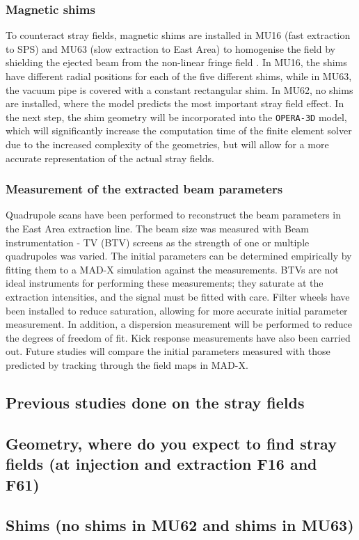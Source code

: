 \subsubsection{Magnetic shims}

To counteract stray fields, magnetic shims are installed in MU16 (fast extraction to SPS) and MU63 (slow extraction to East Area) to homogenise the field by shielding the ejected beam from the non-linear fringe field \cite{zickler_influence_nodate}. In MU16, the shims have different radial positions for each of the five different shims, while in MU63, the vacuum pipe is covered with a constant rectangular shim. In MU62, no shims are installed, where the model predicts the most important stray field effect. In the next step, the shim geometry will be incorporated into the \texttt{OPERA-3D} model, which will significantly increase the computation time of the finite element solver due to the increased complexity of the geometries, but will allow for a more accurate representation of the actual stray fields.

\subsubsection{Measurement of the extracted beam parameters}

Quadrupole scans have been performed to reconstruct the beam parameters in the East Area extraction line. The beam size was measured with Beam instrumentation - TV (BTV) screens as the strength of one or multiple quadrupoles was varied. The initial parameters can be determined empirically by fitting them to a MAD-X simulation against the measurements. BTVs are not ideal instruments for performing these measurements; they saturate at the extraction intensities, and the signal must be fitted with care. Filter wheels have been installed to reduce saturation, allowing for more accurate initial parameter measurement. In addition, a dispersion measurement will be performed to reduce the degrees of freedom of fit.
Kick response measurements have also been carried out. Future studies will compare the initial parameters measured with those predicted by tracking through the field maps in MAD-X.






\subsection{Previous studies done on the stray fields}

\subsection{Geometry, where do you expect to find stray fields (at injection and extraction F16 and F61)}

\subsection{Shims (no shims in MU62 and shims in MU63)}